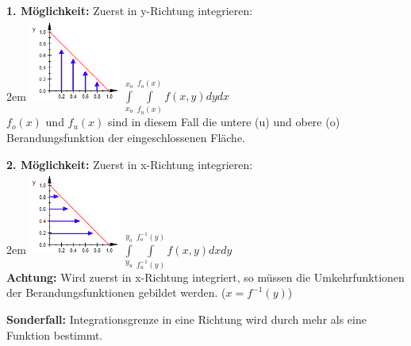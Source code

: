 \documentclass[11pt,final]{scrreprt}
\begin{document}
\textbf{1. Möglichkeit:} Zuerst in y-Richtung integrieren:\\

\begingroup
\leftskip2em 
\includegraphics[width=3cm]{images/flaechenintegral/yRichtung.png}
$\int\limits_{x_u}^{x_o} \int\limits_{f_u(x)}^{f_o(x)} f(x, y) dy dx $\\
$f_o(x)$ und $f_u(x)$ sind in diesem Fall die untere (u) und obere (o) Berandungsfunktion der eingeschlossenen Fläche.\\
\par	
\endgroup

\textbf{2. Möglichkeit:} Zuerst in x-Richtung integrieren:\\

\begingroup
\leftskip2em 
\includegraphics[width=3cm]{images/flaechenintegral/xRichtung.png}
$\int\limits_{y_u}^{y_o} \int\limits_{f_u^{-1}(y)}^{f_o^{-1}(y)} f(x, y) dx dy $\\
\textbf{Achtung:} Wird zuerst in x-Richtung integriert, so müssen die Umkehrfunktionen der Berandungsfunktionen gebildet werden. ($x=f^{-1}(y)$)\\
\par	
\endgroup

\textbf{Sonderfall:} Integrationsgrenze in eine Richtung wird durch mehr als eine Funktion bestimmt.\\
\end{document}
